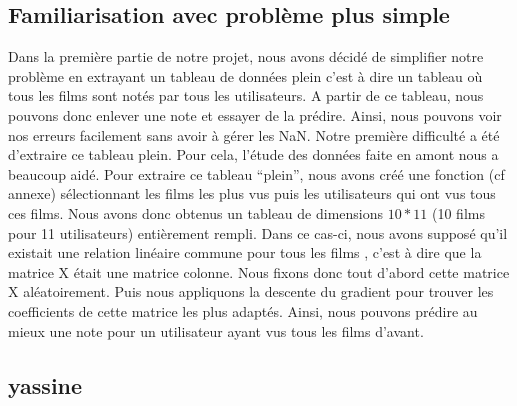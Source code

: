 \documentclass[a4paper,10pt]{article}
\begin{document}
\subsection{Familiarisation avec problème plus simple}
Dans la première partie de notre projet, nous avons décidé de simplifier notre problème en extrayant un tableau de données 
plein c'est à dire un tableau où tous les films sont notés par tous les utilisateurs. 
A partir de ce tableau, nous pouvons donc enlever une note et essayer de la prédire. Ainsi, nous pouvons voir nos erreurs facilement sans avoir à gérer les NaN.
Notre première difficulté a été d'extraire ce tableau plein. Pour cela, l'étude des données faite en amont nous a beaucoup aidé. Pour extraire ce tableau ``plein'', nous avons créé une fonction (cf annexe) sélectionnant les films les plus vus puis les utilisateurs qui ont vus tous ces films. Nous avons donc obtenus un
tableau de dimensions $10 * 11$ (10 films pour 11 utilisateurs) entièrement rempli.
Dans ce cas-ci, nous avons supposé qu'il existait une relation linéaire commune pour tous les films
, c'est à dire que la matrice X était une matrice colonne.
Nous fixons donc tout d'abord cette matrice X aléatoirement. Puis nous appliquons la descente du gradient pour trouver les coefficients de cette matrice les plus adaptés.
Ainsi, nous pouvons prédire au mieux une note pour un utilisateur ayant vus tous les films d'avant.

\subsection{yassine}
\end{document}
